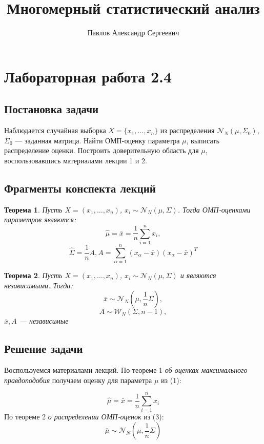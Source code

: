 \documentclass[a4paper]{article}
\title{Многомерный статистический анализ}
\author{Павлов Александр Сергеевич}
\theoremstyle{plain} %
\newtheorem{Theorem}{Теорема}
\begin{document}
\maketitle

\section*{Лабораторная работа 2.4}

\subsection*{Постановка задачи}

Наблюдается случайная выборка $X = \{x_1, \ldots, x_n\}$ из распределения $\mathcal{N}_N(\mu, \Sigma_0)$, $\Sigma_0$ — заданная матрица. Найти ОМП-оценку параметра $\mu$, выписать распределение оценки. Построить доверительную область для $\mu$, воспользовавшись материалами лекции 1 и 2.

\subsection*{Фрагменты конспекта лекций}

\begin{Theorem}
Пусть $X = (x_1, \ldots, x_n)$, $x_i \sim \mathcal{N}_N(\mu, \Sigma)$. Тогда ОМП-оценками параметров являются:
\begin{equation}
\hat{\mu} = \bar{x} = \frac{1}{n} \sum_{i=1}^n{x_i},
\end{equation}
\begin{equation}
\hat{\Sigma} = \frac{1}{n}A, A = \sum_{\alpha=1}^n{(x_\alpha - \bar{x})(x_\alpha - \bar{x})^T}
\end{equation}
\end{Theorem}

\begin{Theorem}
Пусть $X = (x_1, \ldots, x_n)$, $x_i \sim \mathcal{N}_N(\mu, \Sigma)$ и являются независимыми. Тогда:
\begin{equation}
\bar{x} \sim \mathcal{N}_N(\mu, \frac{1}{n}\Sigma),
\end{equation}
\begin{equation}
A \sim \mathcal{W}_N(\Sigma, n-1),
\end{equation}
$\bar{x}, A$ — независимые
\end{Theorem}

\subsection*{Решение задачи}

Воспользуемся материалами лекций. По теореме 1 \textit{об оценках максимального правдоподобия} получаем оценку для параметра $\mu$ из (1):

\begin{equation*}
\hat{\mu} = \bar{x} = \frac{1}{n} \sum_{i=1}^n{x_i}
\end{equation*}
По теореме 2 \textit{о распределении ОМП-оценок} из (3):
\begin{equation*}
\bar{\mu} \sim \mathcal{N}_N(\mu, \frac{1}{n}\Sigma)
\end{equation*}
\end{document}
